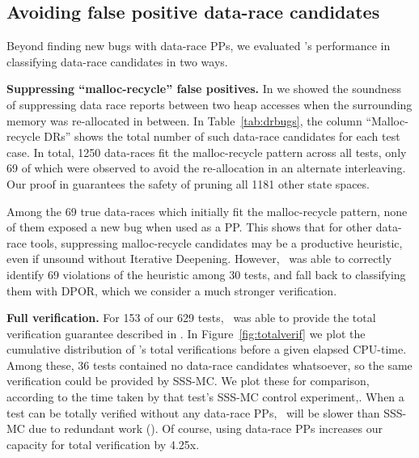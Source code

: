 %


\subsection{Avoiding false positive data-race candidates}
\label{sec:eval-falsepos}

Beyond finding new bugs with data-race PPs, we evaluated \quicksand's performance in classifying data-race candidates in two ways.

{\bf Suppressing ``malloc-recycle'' false positives.}
In \sect{\ref{sec:recycle}} we showed the soundness of suppressing data race reports between two heap accesses when the surrounding memory was re-allocated in between.
In Table~\ref{tab:drbugs}, the column ``Malloc-recycle DRs'' shows the total number of such data-race candidates for each test case.
In total, 1250 data-races fit the malloc-recycle pattern across all tests,
only 69 of which were observed to avoid the re-allocation in an alternate interleaving.
Our proof in \sect{\ref{sec:recycle}} guarantees the safety of pruning all 1181 other state spaces.

Among the 69 true data-races which initially fit the malloc-recycle pattern,
none of them exposed a new bug when used as a PP.
This shows that for other data-race tools,
suppressing malloc-recycle candidates may be a productive heuristic,
even if unsound without Iterative Deepening.
However, \quicksand~was able to correctly identify 69 violations of the heuristic among 30 tests,
and fall back to classifying them with DPOR,
which we consider a much stronger verification.

{\bf Full verification.}
For 153 of our 629 tests, \quicksand~was able to provide the total verification guarantee described in \sect{\ref{sec:totalverif}}.
In Figure~\ref{fig:totalverif} we plot the cumulative distribution of \quicksand's total verifications before a given elapsed CPU-time.
Among these, 36 tests contained no data-race candidates whatsoever, 
so the same verification could be provided by SSS-MC.
We plot these for comparison,
according to the time taken by that test's SSS-MC control experiment,.
When a test can be totally verified without any data-race PPs,
\quicksand~will be slower than SSS-MC due to redundant work (\sect{\ref{sec:future}}).
Of course, using data-race PPs increases our capacity for total verification by 4.25x.

